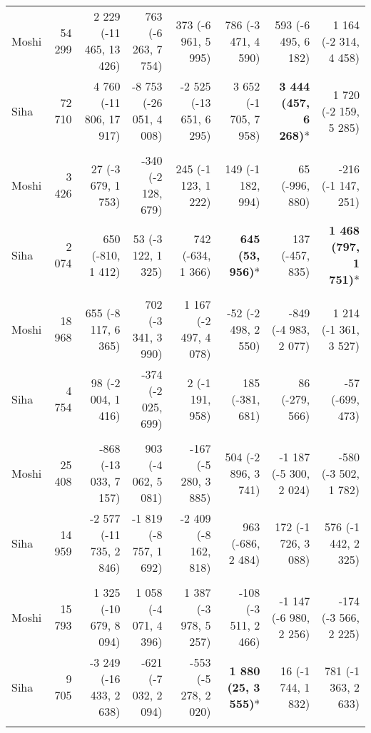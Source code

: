 \begin{table}[t]
\begin{tabular*}{\linewidth}{@{\extracolsep{\fill}}l|rrrrrrr}
\midrule\addlinespace[2.5pt]
Moshi & 54 299 & 2 229 (-11 465, 13 426) & 763 (-6 263, 7 754) & 373 (-6 961, 5 995) & 786 (-3 471, 4 590) & 593 (-6 495, 6 182) & 1 164 (-2 314, 4 458) \\ 
Siha & 72 710 & 4 760 (-11 806, 17 917) & -8 753 (-26 051, 4 008) & -2 525 (-13 651, 6 295) & 3 652 (-1 705, 7 958) & \textbf{3 444 (457, 6 268)}* & 1 720 (-2 159, 5 285) \\ 
\midrule\addlinespace[2.5pt]
\multicolumn{8}{l}{Neoplasms/Cancer} \\[2.5pt] 
\midrule\addlinespace[2.5pt]
Moshi & 3 426 & 27 (-3 679, 1 753) & -340 (-2 128, 679) & 245 (-1 123, 1 222) & 149 (-1 182, 994) & 65 (-996, 880) & -216 (-1 147, 251) \\ 
Siha & 2 074 & 650 (-810, 1 412) & 53 (-3 122, 1 325) & 742 (-634, 1 366) & \textbf{645 (53, 956)}* & 137 (-457, 835) & \textbf{1 468 (797, 1 751)}* \\ 
\midrule\addlinespace[2.5pt]
\multicolumn{8}{l}{Other Cardiovascular Diseases} \\[2.5pt] 
\midrule\addlinespace[2.5pt]
Moshi & 18 968 & 655 (-8 117, 6 365) & 702 (-3 341, 3 990) & 1 167 (-2 497, 4 078) & -52 (-2 498, 2 550) & -849 (-4 983, 2 077) & 1 214 (-1 361, 3 527) \\ 
Siha & 4 754 & 98 (-2 004, 1 416) & -374 (-2 025, 699) & 2 (-1 191, 958) & 185 (-381, 681) & 86 (-279, 566) & -57 (-699, 473) \\ 
\midrule\addlinespace[2.5pt]
\multicolumn{8}{l}{Mild/Moderate Anemia} \\[2.5pt] 
\midrule\addlinespace[2.5pt]
Moshi & 25 408 & -868 (-13 033, 7 157) & 903 (-4 062, 5 081) & -167 (-5 280, 3 885) & 504 (-2 896, 3 741) & -1 187 (-5 300, 2 024) & -580 (-3 502, 1 782) \\ 
Siha & 14 959 & -2 577 (-11 735, 2 846) & -1 819 (-8 757, 1 692) & -2 409 (-8 162, 818) & 963 (-686, 2 484) & 172 (-1 726, 3 088) & 576 (-1 442, 2 325) \\ 
\midrule\addlinespace[2.5pt]
\multicolumn{8}{l}{Caries} \\[2.5pt] 
\midrule\addlinespace[2.5pt]
Moshi & 15 793 & 1 325 (-10 679, 8 094) & 1 058 (-4 071, 4 396) & 1 387 (-3 978, 5 257) & -108 (-3 511, 2 466) & -1 147 (-6 980, 2 256) & -174 (-3 566, 2 225) \\ 
Siha & 9 705 & -3 249 (-16 433, 2 638) & -621 (-7 032, 2 094) & -553 (-5 278, 2 020) & \textbf{1 880 (25, 3 555)}* & 16 (-1 744, 1 832) & 781 (-1 363, 2 633) \\ 
\midrule\addlinespace[2.5pt]
\multicolumn{8}{l}{Poisoning} \\[2.5pt] 

\end{tabular*}
\end{table}

